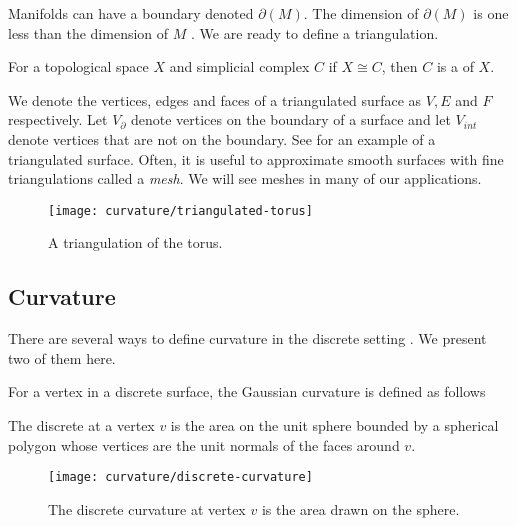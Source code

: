 Manifolds can have a boundary denoted $\partial(M)$.
The dimension of $\partial(M)$ is one less than the dimension of $M$ .
We are ready to define a triangulation.

\begin{definition}[Triangulation]
For a topological space $X$ and simplicial complex $C$ if $X\cong C$,
then $C$  is a  of $X$.
\end{definition}

We denote the vertices, edges and faces of a triangulated surface as $V, E$ and $F$ respectively.
Let $V_{\partial}$ denote vertices on the boundary of a surface and let $V_{int}$ 
denote vertices that are not on the boundary.
See  for an example of a triangulated surface.
Often, it is useful to approximate smooth surfaces with fine triangulations called
a \emph{mesh}. We will see meshes in many of our applications.


\begin{figure}[htb]
\centering
\texttt{[image: curvature/triangulated-torus]}
\caption{A triangulation of the torus.}
\label{fig:triangulated-torus}
\end{figure}

\subsection{Curvature}

There are several ways to define curvature in the discrete setting \cite{Crane:2013}.
We present two of them here. 




For a vertex in a discrete surface, the Gaussian curvature is defined as
follows

\begin{definition}\label{def:discrete-curvature-vertex}

The discrete  at a vertex $v$ is the area on the unit sphere bounded by a spherical polygon whose vertices are the unit normals of the faces around $v$.

\end{definition}


\begin{figure}[htb]
\centering
\texttt{[image: curvature/discrete-curvature]}
\caption{The discrete curvature at vertex $v$ is the area drawn on the sphere.}
\label{fig:discrete-curvature}
\end{figure}


